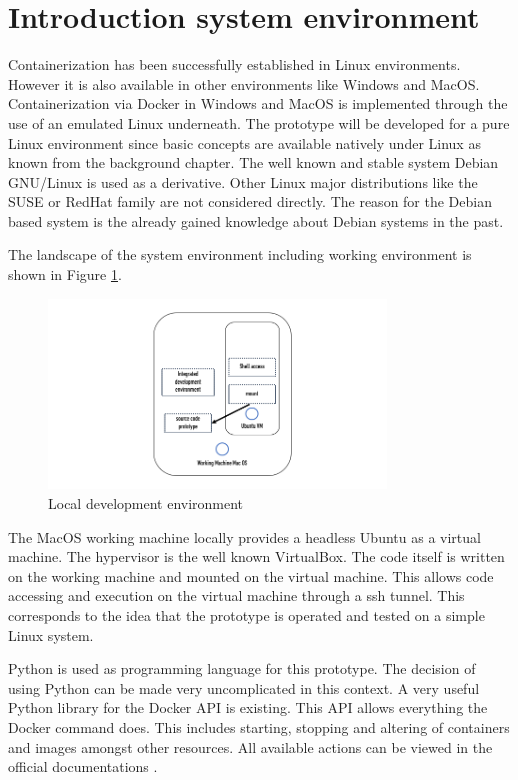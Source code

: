 \section{Introduction system environment}
\label{ch:practical_realization:sys_env}

Containerization has been successfully established in Linux environments.
However it is also available in other environments like Windows and MacOS.
Containerization via Docker in Windows and MacOS is implemented through the use of an emulated Linux underneath.
The prototype will be developed for a pure Linux environment since basic concepts are available natively under Linux as known from the background chapter.
The well known and stable system Debian GNU/Linux is used as a derivative. 
Other Linux major distributions like the SUSE or RedHat family are not considered directly.
The reason for the Debian based system is the already gained knowledge about Debian systems in the past. 

The landscape of the system environment including working environment is shown in Figure \ref{fig:pract:sys_env}.
\begin{figure}[h!]
 \centering
 \includegraphics[width=0.8\textwidth]{gfx/examples/sys_env.png}
 \caption{Local development environment}
 \label{fig:pract:sys_env}
\end{figure}
The MacOS working machine locally provides a headless Ubuntu as a virtual machine. 
The hypervisor is the well known VirtualBox.
The code itself is written on the working machine and mounted on the virtual machine. 
This allows code accessing and execution on the virtual machine through a ssh tunnel. 
This corresponds to the idea that the prototype is operated and tested on a simple Linux system.

Python is used as programming language for this prototype. 
The decision of using Python can be made very uncomplicated in this context. 
A very useful Python library for the Docker API is existing. 
This API allows everything the Docker command does. 
This includes starting, stopping and altering of containers and images amongst other resources. 
All available actions can be viewed in the official documentations \cite{python_sdk}. 

